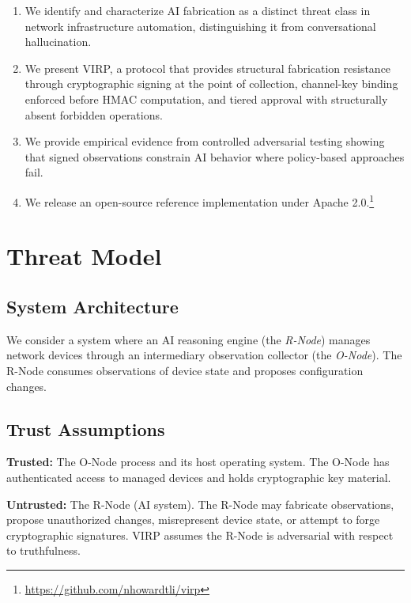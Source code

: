 \documentclass[11pt,twocolumn]{article}
\begin{document}
\begin{enumerate}[leftmargin=*]
    \item We identify and characterize AI fabrication as a distinct threat class in network infrastructure automation, distinguishing it from conversational hallucination.

    \item We present VIRP, a protocol that provides structural fabrication resistance through cryptographic signing at the point of collection, channel-key binding enforced before HMAC computation, and tiered approval with structurally absent forbidden operations.

    \item We provide empirical evidence from controlled adversarial testing showing that signed observations constrain AI behavior where policy-based approaches fail.

    \item We release an open-source reference implementation under Apache 2.0.\footnote{\url{https://github.com/nhowardtli/virp}}
\end{enumerate}

\section{Threat Model}

\subsection{System Architecture}

We consider a system where an AI reasoning engine (the \textit{R-Node}) manages network devices through an intermediary observation collector (the \textit{O-Node}). The R-Node consumes observations of device state and proposes configuration changes.

\subsection{Trust Assumptions}

\textbf{Trusted:} The O-Node process and its host operating system. The O-Node has authenticated access to managed devices and holds cryptographic key material.

\textbf{Untrusted:} The R-Node (AI system). The R-Node may fabricate observations, propose unauthorized changes, misrepresent device state, or attempt to forge cryptographic signatures. VIRP assumes the R-Node is adversarial with respect to truthfulness.
\end{document}
